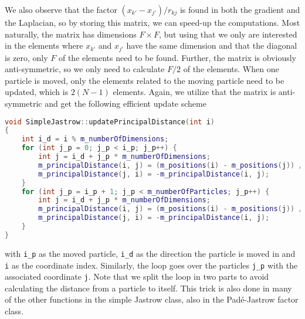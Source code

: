 We also observe that the factor $(x_{k'}-x_{j'})/r_{kj}$ is found in both the gradient and the Laplacian, so by storing this matrix, we can speed-up the computations. Most naturally, the matrix has dimensions $F\times F$, but using that we only are interested in the elements where $x_{k'}$ and $x_{j'}$ have the same dimension and that the diagonal is zero, only $F$ of the elements need to be found. Further, the matrix is obviously anti-symmetric, so we only need to calculate $F/2$ of the elements. When one particle is moved, only the elements related to the moving particle need to be updated, which is $2(N-1)$ elements. Again, we utilize that the matrix is anti-symmetric and get the following efficient update scheme
\begin{lstlisting}[language={c++}]
void SimpleJastrow::updatePrincipalDistance(int i)
{
	int i_d = i % m_numberOfDimensions;
	for (int j_p = 0; j_p < i_p; j_p++) {
		int j = i_d + j_p * m_numberOfDimensions;
		m_principalDistance(i, j) = (m_positions(i) - m_positions(j)) / m_distanceMatrix(i_p, j_p);
		m_principalDistance(j, i) = -m_principalDistance(i, j);
	}
	for (int j_p = i_p + 1; j_p < m_numberOfParticles; j_p++) {
		int j = i_d + j_p * m_numberOfDimensions;
		m_principalDistance(i, j) = (m_positions(i) - m_positions(j)) / m_distanceMatrix(i_p, j_p);
		m_principalDistance(j, i) = -m_principalDistance(i, j);
	}
}
\end{lstlisting}
with \lstinline{i_p} as the moved particle, \lstinline{i_d} as the direction the particle is moved in and \lstinline|i| as the coordinate index. Similarly, the loop goes over the particles \lstinline{j_p} with the associated coordinate \lstinline{j}. Note that we split the loop in two parts to avoid calculating the distance from a particle to itself. This trick is also done in many of the other functions in the simple Jastrow class, also in the Padé-Jastrow factor class. 

